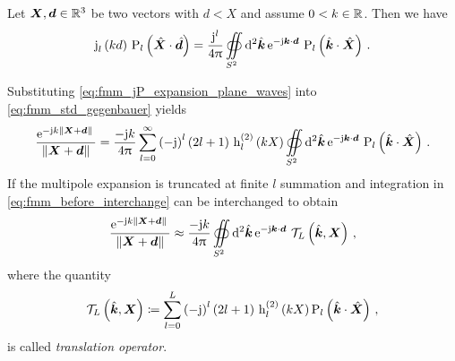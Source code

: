 \begin{lemma}
	Let $\pvec{X}, \pvec{d} \in \R^3$ be two vectors with
	$d < X$ and assume $0 < k \in \mathbb{R}$.
	Then we have \cite[410]{Stratton2007}
	\begin{equation}\label{eq:fmm_jP_expansion_plane_waves}
		\sphbesselj{l} \left( k d \right) \,
		\legendrepl{l} \left( \uv{X} \cdot \uv{d} \right) = 
		\frac{\im^l}{4\pi}	
		\ewaldintegral
		\exp{-\im \pvec{k} \cdot \pvec{d}}
		\legendrepl{l} \left( \uv{k} \cdot \uv{X} \right)
		\, .
	\end{equation}
\end{lemma}

Substituting \eqref{eq:fmm_jP_expansion_plane_waves} into
\eqref{eq:fmm_std_gegenbauer} yields
\begin{equation}\label{eq:fmm_before_interchange}
	\frac{\exp{-\im k \norm{\pvec{X} + \pvec{d}}}}{\norm{\pvec{X} + \pvec{d}}} = 
	\frac{-\im k}{4\pi}
	\sum\limits_{l=0}^{\infty}
	\left( -\im \right)^l
	\left( 2l + 1 \right) \,
	\sphbesselh{2}{l} \left( k X \right) 
	\ewaldintegral
	\exp{-\im \pvec{k} \cdot \pvec{d}}
	\legendrepl{l} \left( \uv{k} \cdot \uv{X} \right)
	\, .
\end{equation}
If the multipole expansion is truncated at finite $l$ summation and integration
in \eqref{eq:fmm_before_interchange} can be interchanged
\cite{Rokhlin1993,Coifman1993} to obtain
\begin{equation}\label{eq:fmm_std}
	\frac{\exp{-\im k \norm{\pvec{X} + \pvec{d}}}}{\norm{\pvec{X} + \pvec{d}}}
	\approx 
	\frac{-\im k}{4\pi}
	\ewaldintegral
	\exp{-\im \pvec{k} \cdot \pvec{d}} \,
	\mathcal{T}_L
	\left( \uv{k}, \pvec{X} \right)
	\, ,
\end{equation}
where the quantity
\begin{equation}
	\mathcal{T}_L
	\left( \uv{k}, \pvec{X} \right)
	\coloneqq
	\sum\limits_{l=0}^{L}
	\left( -\im \right)^l
	\left( 2l + 1 \right) \,
	\sphbesselh{2}{l} \left( k X \right) 
	\legendrepl{l} \left( \uv{k} \cdot \uv{X} \right)
	\, ,
\end{equation}
is called \emph{translation operator}.





